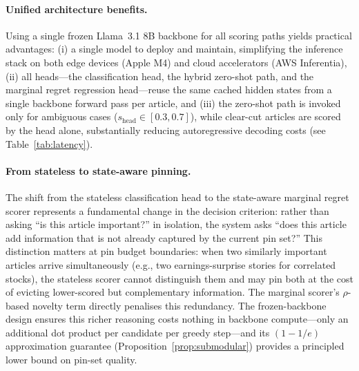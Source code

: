 \documentclass{article}
\begin{document}
\paragraph{Unified architecture benefits.}
Using a single frozen Llama~3.1 8B backbone for all scoring paths yields practical advantages: (i) a single model to deploy and maintain, simplifying the inference stack on both edge devices (Apple M4) and cloud accelerators (AWS Inferentia), (ii) all heads---the classification head, the hybrid zero-shot path, and the marginal regret regression head---reuse the same cached hidden states from a single backbone forward pass per article, and (iii) the zero-shot path is invoked only for ambiguous cases ($s_{\text{head}} \in [0.3, 0.7]$), while clear-cut articles are scored by the head alone, substantially reducing autoregressive decoding costs (see Table~\ref{tab:latency}).

\paragraph{From stateless to state-aware pinning.}
The shift from the stateless classification head to the state-aware marginal regret scorer represents a fundamental change in the decision criterion: rather than asking ``is this article important?'' in isolation, the system asks ``does this article add information that is not already captured by the current pin set?''
This distinction matters at pin budget boundaries: when two similarly important articles arrive simultaneously (e.g., two earnings-surprise stories for correlated stocks), the stateless scorer cannot distinguish them and may pin both at the cost of evicting lower-scored but complementary information.
The marginal scorer's $\rho$-based novelty term directly penalises this redundancy.
The frozen-backbone design ensures this richer reasoning costs nothing in backbone compute---only an additional dot product per candidate per greedy step---and its $(1-1/e)$ approximation guarantee (Proposition~\ref{prop:submodular}) provides a principled lower bound on pin-set quality.
\end{document}
